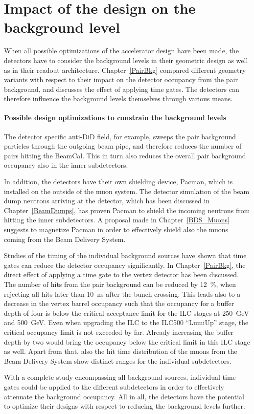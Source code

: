 \section{Impact of the \sid design on the background level}

When all possible optimizations of the accelerator design have been made, the detectors have to consider the background levels in their geometric design as well as in their readout architecture.
Chapter~\ref{PairBkg} compared different \sid geometry variants with respect to their impact on the detector occupancy from the pair background, and discusses the effect of applying time gates.
The detectors can therefore influence the background levels themselves through various means.

\paragraph{Possible \sid design optimizations to constrain the background levels}

The detector specific anti-DiD field, for example, sweeps the pair background particles through the outgoing beam pipe, and therefore reduces the number of pairs hitting the \sid BeamCal.
This in turn also reduces the overall pair background occupancy also in the inner subdetectors.

In addition, the detectors have their own shielding device, Pacman, which is installed on the outside of the muon system.
The detector simulation of the beam dump neutrons arriving at the \sid detector, which has been discussed in Chapter~\ref{BeamDumps}, has proven Pacman to shield the incoming neutrons from hitting the inner subdetectors.
A proposal made in Chapter~\ref{BDS_Muons} suggests to magnetize Pacman in order to effectively shield also the muons coming from the Beam Delivery System.

Studies of the timing of the individual background sources have shown that time gates can reduce the detector occupancy significantly.
In Chapter~\ref{PairBkg}, the direct effect of applying a time gate to the \sid vertex detector has been discussed.
The number of hits from the pair background can be reduced by \SI{12}{\percent}, when rejecting all hits later than \SI{10}{\nano\second} after the bunch crossing.
This leads also to a decrease in the vertex barrel occupancy such that the occupancy for a buffer depth of four is below the critical acceptance limit for the ILC stages at \SI{250}{\GeV} and \SI{500}{\GeV}. 
Even when upgrading the ILC to the ILC500 ``LumiUp'' stage, the critical occupancy limit is not exceeded by far.
Already increasing the buffer depth by two would bring the occupancy below the critical limit in this ILC stage as well.
Apart from that, also the hit time distribution of the muons from the Beam Delivery System show distinct ranges for the individual \sid subdetectors.

With a complete study encompassing all background sources, individual time gates could be applied to the different \sid subdetectors in order to effectively attenuate the background occupancy.
All in all, the detectors have the potential to optimize their designs with respect to reducing the background levels further.